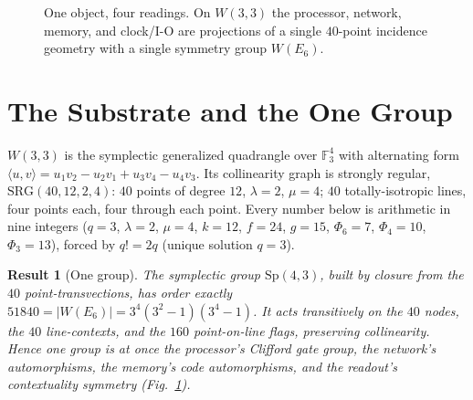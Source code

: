 \documentclass[11pt]{article}
\newtheorem{result}{Result}
\begin{document}
\begin{figure}[ht]
\centering
{}
\caption{One object, four readings. On $W(3,3)$ the processor, network, memory, and clock/I-O are
projections of a single $40$-point incidence geometry with a single symmetry group $W(E_6)$.}
\label{fig:oneobject}
\end{figure}

\section{The Substrate and the One Group}
$W(3,3)$ is the symplectic generalized quadrangle over $\mathbb{F}_3^4$ with alternating form
$\langle u,v\rangle = u_1v_2-u_2v_1+u_3v_4-u_4v_3$. Its collinearity graph is strongly regular,
$\mathrm{SRG}(40,12,2,4)$: $40$ points of degree $12$, $\lambda=2$, $\mu=4$; $40$ totally-isotropic
lines, four points each, four through each point. Every number below is arithmetic in nine integers
($q=3$, $\lambda=2$, $\mu=4$, $k=12$, $f=24$, $g=15$, $\Phi_6=7$, $\Phi_4=10$, $\Phi_3=13$), forced by
$q!=2q$ (unique solution $q=3$).

\begin{result}[One group]
The symplectic group $\mathrm{Sp}(4,3)$, built by closure from the $40$ point-transvections, has order
exactly $51840=|W(E_6)|=3^4(3^2-1)(3^4-1)$. It acts transitively on the $40$ nodes, the $40$
line-contexts, and the $160$ point-on-line flags, preserving collinearity. Hence one group is at once
the processor's Clifford gate group, the network's automorphisms, the memory's code automorphisms, and
the readout's contextuality symmetry (Fig.~\ref{fig:oneobject}).
\end{result}
\end{document}
